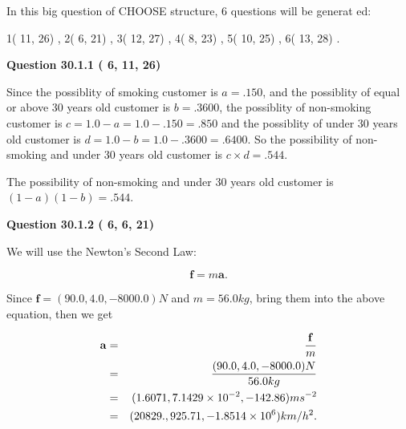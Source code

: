\documentclass[12pt]{article}
\begin{document}
   
\vspace{0.2in}
   
 In this big question of CHOOSE structure,           6 questions will be generat
 ed: 
  
  
            1(         11,         26)
 ,
            2(          6,         21)
 ,
            3(         12,         27)
 ,
            4(          8,         23)
 ,
            5(         10,         25)
 ,
            6(         13,         28)
 .
  
\vspace{0.2in}
  
{\textbf{\Large{Question
30.1.1 
 (          6,         11,         26)
}}}
  
  
 
 
\noindent{}

Since the possiblity of  %
smoking customer is $ a =  %
.150 $,
and the possiblity of  %
equal or above 30 years old customer is $ b =  %
.3600 $,
the possiblity of  %
non-smoking customer is $ c = 1.0 - a = 1.0 -
.150
=  %
.850 $ and the possiblity of  %
under 30 years old
customer is $ d = 1.0 - b = 1.0 -  %
.3600 =  %
.6400  $.
So the possibility of  %
 non-smoking and  %
under 30 years old
customer is $ c \times d =  %
.544 $.
 
 
 
 
 
\noindent{}

The possibility of  %
 non-smoking and  %
under 30 years old
customer is $ (1-a)(1-b) =  %
.544 $.
 
 
  
\vspace{0.2in}
  
{\textbf{\Large{Question
30.1.2 
 (          6,          6,         21)
}}}
  
  
 
 
\noindent{}

We will use the Newton's Second Law:
 
\[
\mathbf{f}=m\mathbf{a}.
\]
 
Since $\mathbf{f}=( %
90.0,  %
4.0,  %
-8000.0 )N$
and $m= %
56.0 kg$, bring them into the above equation, then we get
 
\begin{eqnarray*}
\mathbf{a}&=&\frac{\mathbf{f}}m  \\
&=&\frac{(
90.0 ,
4.0 ,
-8000.0 )N
}{ %
56.0 kg}  \\
&=&(
1.6071 ,
7.1429 \times 10^{-2},
-142.86
)ms^{-2} \\
&=&(
20829. ,
925.71 ,
-1.8514 \times 10^{6}
)km/h^2.
\end{eqnarray*}
 
\end{document}
